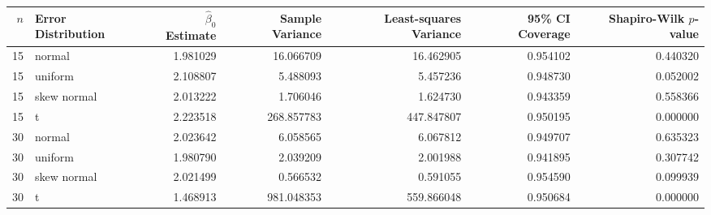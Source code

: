 \begin{tabular}{rlrrrrr}
\toprule
 $n$ & Error Distribution &  $\hat{\beta}_0$ Estimate &  Sample Variance &  Least-squares Variance &  95\% CI Coverage &  Shapiro-Wilk $p$-value \\
\midrule
  15 &             normal &                  1.981029 &        16.066709 &               16.462905 &         0.954102 &                0.440320 \\
  15 &            uniform &                  2.108807 &         5.488093 &                5.457236 &         0.948730 &                0.052002 \\
  15 &        skew normal &                  2.013222 &         1.706046 &                1.624730 &         0.943359 &                0.558366 \\
  15 &                  t &                  2.223518 &       268.857783 &              447.847807 &         0.950195 &                0.000000 \\
  30 &             normal &                  2.023642 &         6.058565 &                6.067812 &         0.949707 &                0.635323 \\
  30 &            uniform &                  1.980790 &         2.039209 &                2.001988 &         0.941895 &                0.307742 \\
  30 &        skew normal &                  2.021499 &         0.566532 &                0.591055 &         0.954590 &                0.099939 \\
  30 &                  t &                  1.468913 &       981.048353 &              559.866048 &         0.950684 &                0.000000 \\
\bottomrule
\end{tabular}

